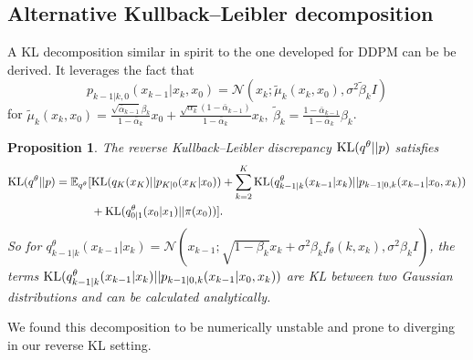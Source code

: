 \documentclass{article} %
\newtheorem{proposition}{Proposition}
\begin{document}
\subsection{Alternative Kullback--Leibler decomposition}\label{app:alternativeKL}
A KL decomposition similar in spirit to the one developed for DDPM \citep{ho2020denoising} can be be derived. It leverages the fact that 
\begin{equation}
p_{k-1|k,0}(x_{k-1}|x_{k},x_0)=\mathcal{N}(x_k;\tilde{\mu}_{k}(x_{k},x_0),\sigma^2 \tilde{\beta}_{k} I)
\end{equation}
for $\tilde{\mu}_{k}(x_{k},x_0)=\frac{\sqrt{\bar{\alpha}_{k-1}}\beta_{k}}{1-\bar{\alpha}_{k}}x_0+\frac{\sqrt{\alpha_{k}}(1-\bar{\alpha}_{k-1})}{1-\bar{\alpha}_{k}}x_{k},~\tilde{\beta}_{k}=\frac{1-\bar{\alpha}_{k-1}}{1-\bar{\alpha}_{k}}\beta_k$.
\begin{proposition}
The reverse Kullback--Leibler discrepancy $\mathrm{KL}(q^{\theta}||p)$ satisfies
\begin{align*}
\mathrm{KL}(q^{\theta}||p)=\mathbb{E}_{q^{\theta}}[&\mathrm{KL}(q_K(x_K)||p_{K|0}(x_K|x_0))
+\sum_{k=2}^{K} \mathrm{KL}(q^{\theta}_{k-1|k}(x_{k-1}|x_k)||p_{k-1|0,k}(x_{k-1}|x_0,x_k))\\
&+   \mathrm{KL}(q^{\theta}_{0|1}(x_0|x_1)||\pi(x_0))].
\end{align*}
So for $q^\theta_{k-1|k}(x_{k-1}|x_k)=\mathcal{N}(x_{k-1};\sqrt{1-\beta_k}x_k+ \sigma^2 \beta_k f_\theta(k,x_k),\sigma^2 \beta_k I)$, the terms $ \mathrm{KL}(q^{\theta}_{k-1|k}(x_{k-1}|x_k)||p_{k-1|0,k}(x_{k-1}|x_0,x_k))$ are KL between two Gaussian distributions and can be calculated analytically.
\end{proposition} 
We found this decomposition to be numerically unstable and prone to diverging in our reverse KL setting. 
\end{document}
